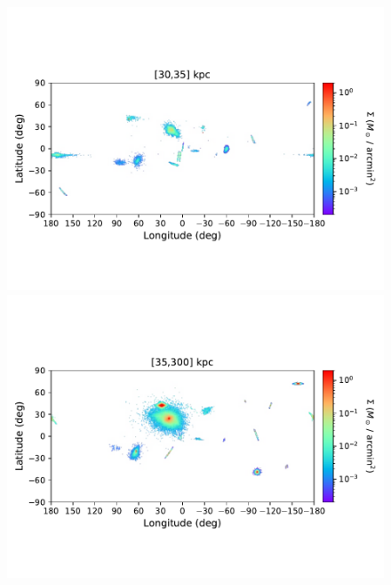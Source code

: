 \begin{figure}[h!]
\begin{center}
            \includegraphics[clip=true, trim = 0mm 15mm 0mm 20mm, width=0.9\columnwidth]{images/PII_ensemble_LB_D30-35_mass_est_new.pdf}
            \includegraphics[clip=true, trim = 0mm 15mm 0mm 20mm, width=0.9\columnwidth]{images/PII_ensemble_LB_D35-300_mass_est_new.pdf}



\end{center}
\end{figure}
